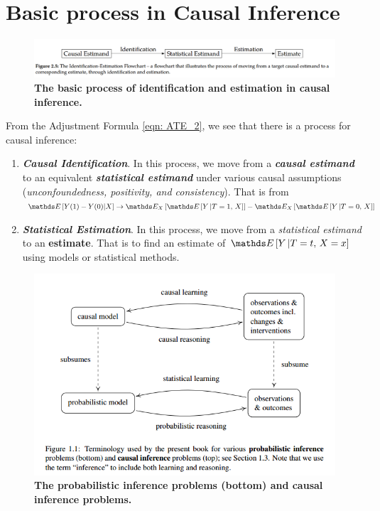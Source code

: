\documentclass[11pt]{article}
\begin{document}
\newpage
\section{Basic process in Causal Inference}
\begin{figure}
\begin{minipage}[t]{1\linewidth}
  \centering
  \centerline{\includegraphics[scale = 0.35]{idt_est.png}}
\end{minipage}
\caption{\footnotesize{\textbf{The basic process of identification and estimation in causal inference.  \citep{neal2020introduction}}}}
\label{fig: idt_est}
\end{figure}

From the Adjustment Formula \eqref{eqn: ATE_2}, we see that there is a process for causal inference: 
\begin{enumerate}
\item \textbf{\emph{Causal Identification}}. In this process, we move from a \emph{\textbf{causal estimand}} to an equivalent \emph{\textbf{statistical estimand}} under various causal assumptions (\emph{unconfoundedness, positivity, and consistency}). That is from $\E{}{Y(1) - Y(0) | X} \rightarrow  \E{X}{ \E{}{Y \,|T=1,\,X }} - \E{X}{\E{}{Y \,|T=0, \, X}}$

\item \textbf{\emph{Statistical Estimation}}. In this process, we move from a \emph{statistical estimand} to an \textbf{estimate}. That is to find an estimate of $\E{}{Y \,|T=t, \, X=x}$ using models or statistical methods.
\end{enumerate}

\begin{figure}
\begin{minipage}[t]{1\linewidth}
  \centering
  \centerline{\includegraphics[scale = 0.6]{causal_learning.png}}
\end{minipage}
\caption{\footnotesize{\textbf{The probabilistic inference
problems (bottom) and causal inference problems.  \citep{peters2017elements}}}}
\label{fig: causal_learning}
\end{figure}
\end{document}
